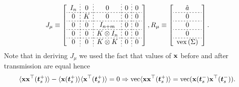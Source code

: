 \documentclass[letterpaper, 10 pt,one column, conference]{ieeeconf}  %
\begin{document}
\begin{equation}
J_\mu \equiv    \left[\begin{array}{c;{2pt/2pt}c;{2pt/2pt}c;{2pt/2pt}c;{2pt/2pt}c}
I_n & 0 & 0 & 0& 0\\ \hdashline[2pt/2pt]0 &  K & 0 & 0&0 \\ \hdashline[2pt/2pt] 0& 0& I_{n+m}&0& 0  \\ \hdashline[2pt/2pt] 0& 0&  K \otimes I_n &0 & 0\\ \hdashline[2pt/2pt] 0&0&  K \otimes K  &0& 0	\end{array}\right],
R_\mu \equiv  \left[\begin{array}{c}
\hat{a}\\ \hdashline[2pt/2pt]0\\ \hdashline[2pt/2pt] 0\\ \hdashline[2pt/2pt]0\\ \hdashline[2pt/2pt]{\rm vex}\left(\Sigma\right) 
\end{array}\right]. \label{Jmu}
\end{equation}
Note that in deriving ${J_\mu}$ we used the fact that values of $\bold x$ before and after transmission are equal hence
\begin{equation}\begin{aligned}
\langle  \bold x \bold   x^\top (\boldsymbol{t}_s^+)\rangle - \langle \bold x (\boldsymbol{t}_s^+) \rangle \langle  \bold   x^\top (\boldsymbol{t}_s^+)\rangle =0  \Rightarrow 
{\rm vec}  \langle \bold x \bold x^\top (\boldsymbol{t}_s^+)\rangle  =  {\rm vec}  ( \bold x (\boldsymbol{t}_s^-) \bold x^\top (\boldsymbol{t}_s^-)).
\end{aligned}
\end{equation}








\end{document}
